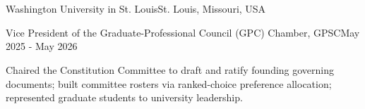 \documentclass[10pt, letterpaper]{article}
\begin{document}
\vspace{\headerSpacing}


\section{}

\vspace{\entrySpacing}
\begin{leadershipentry}{Washington University in St. Louis}{St. Louis, Missouri, USA}
	\begin{positionentry}{Vice President of the Graduate-Professional Council (GPC) Chamber, GPSC}{May 2025 - May 2026}
		\item Chaired the Constitution Committee to draft and ratify founding governing documents; built committee rosters via ranked-choice preference allocation; represented graduate students to university leadership.
	\end{positionentry}
\end{leadershipentry}

\end{document}
